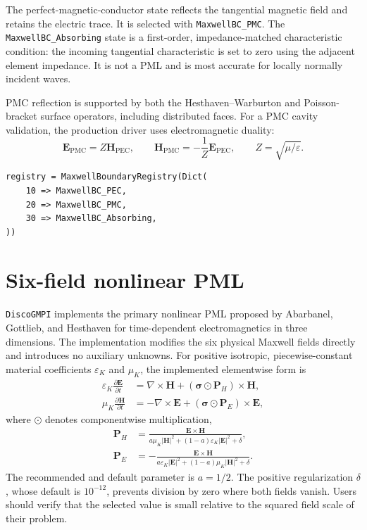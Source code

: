 \documentclass[11pt,oneside]{book}
\newcommand{\pkg}{\texttt{DiscoGMPI}}
\newcommand{\code}[1]{\texttt{#1}}
\newcommand{\vect}[1]{\boldsymbol{#1}}
\begin{document}
The perfect-magnetic-conductor state reflects the tangential magnetic field
and retains the electric trace. It is selected with
\code{MaxwellBC\_PMC}. The \code{MaxwellBC\_Absorbing} state is a first-order,
impedance-matched characteristic condition: the incoming tangential
characteristic is set to zero using the adjacent element impedance. It is not
a PML and is most accurate for locally normally incident waves.

PMC reflection is supported by both the Hesthaven--Warburton and
Poisson-bracket surface operators, including distributed faces. For a PMC
cavity validation, the production driver uses electromagnetic duality:
\[
  \vect E_{\mathrm{PMC}}=Z\vect H_{\mathrm{PEC}},\qquad
  \vect H_{\mathrm{PMC}}=-\frac{1}{Z}\vect E_{\mathrm{PEC}},
  \qquad Z=\sqrt{\mu/\varepsilon}.
\]

\begin{lstlisting}
registry = MaxwellBoundaryRegistry(Dict(
    10 => MaxwellBC_PEC,
    20 => MaxwellBC_PMC,
    30 => MaxwellBC_Absorbing,
))
\end{lstlisting}

\section{Six-field nonlinear PML}
\label{sec:nonlinear-pml}

\pkg{} implements the primary nonlinear PML proposed by Abarbanel, Gottlieb,
and Hesthaven for time-dependent electromagnetics in three dimensions. The
implementation modifies the six physical Maxwell fields directly and
introduces no auxiliary unknowns. For positive isotropic, piecewise-constant
material coefficients $\varepsilon_K$ and $\mu_K$, the implemented elementwise
form is
\begin{align}
  \varepsilon_K\frac{\partial \vect E}{\partial t}
    &= \nabla\times\vect H
       + (\vect\sigma\odot\vect P_H)\times\vect H,
       \label{eq:nonlinear-pml-e}\\
  \mu_K\frac{\partial \vect H}{\partial t}
    &= -\nabla\times\vect E
       + (\vect\sigma\odot\vect P_E)\times\vect E,
       \label{eq:nonlinear-pml-h}
\end{align}
where $\odot$ denotes componentwise multiplication,
\begin{align}
  \vect P_H
    &=
    \frac{\vect E\times\vect H}
    {a\mu_K|\vect H|^2+(1-a)\varepsilon_K|\vect E|^2+\delta},\\
  \vect P_E
    &=
    -\frac{\vect E\times\vect H}
    {a\varepsilon_K|\vect E|^2+(1-a)\mu_K|\vect H|^2+\delta}.
\end{align}
The recommended and default parameter is $a=1/2$. The positive
regularization $\delta$, whose default is $10^{-12}$, prevents division by
zero where both fields vanish. Users should verify that the selected value is
small relative to the squared field scale of their problem.
\end{document}
